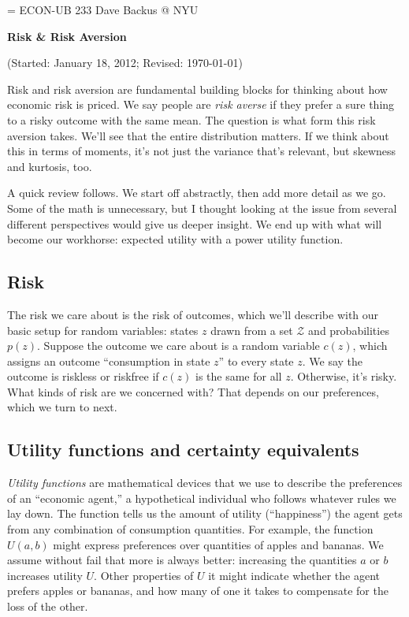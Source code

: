 \documentclass[11pt]{article}
\begin{document}
\parskip=\bigskipamount
\parindent=0.0in
\thispagestyle{empty}
{\large ECON-UB 233 \hfill Dave Backus @ NYU}

\bigskip\bigskip
\centerline{\Large \bf Risk \& Risk Aversion}
\centerline{(Started: January 18, 2012; Revised: \today)}

\bigskip
Risk and risk aversion are fundamental building blocks
for thinking about how economic risk is priced.
We say people are {\it risk averse\/} if they
prefer a sure thing to a risky outcome with the same mean.
The question is what form this risk aversion takes.
We'll see that the entire distribution matters.
If we think about this in terms of moments,
it's not just the variance that's relevant,
but skewness and kurtosis, too.

A quick review follows.
We start off abstractly,
then add more detail as we go.
Some of the math is unnecessary,
but I thought looking at the issue from several different
perspectives would give us deeper insight.
We end up with what will become our workhorse:
expected utility with a power utility function.


\subsection*{Risk}

The risk we care about is the risk of outcomes,
which we'll describe with our basic setup for random variables:
states $z$ drawn from a set $\mathcal{Z}$ and probabilities $p(z)$.
Suppose the outcome we care about is a random variable $c(z)$,
which assigns an outcome ``consumption in state $z$''
to every state $z$.
We say the outcome is riskless or riskfree if $c(z)$ is
the same for all $z$.
Otherwise, it's risky.
What kinds of risk are we concerned with?
That depends on our preferences, which we turn to next.


\subsection*{Utility functions and certainty equivalents}

{\it Utility functions\/} are mathematical devices that we use
to describe the preferences of an ``economic agent,''
a hypothetical individual who follows whatever rules we lay down.
The function tells us the amount of utility (``happiness'')
the agent gets from any combination of consumption quantities.
For example, the function $U(a,b)$ might express preferences
over quantities of apples and bananas.
We assume without fail that more is always better:
increasing the quantities $a$ or $b$ increases utility $U$.
Other properties of $U$ it might indicate
whether the agent prefers apples or bananas,
and how many of one it takes to compensate for the loss of the other.
\end{document}

